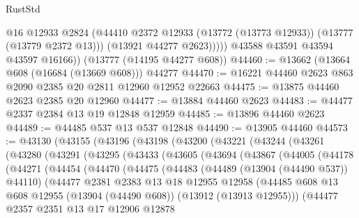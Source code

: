 \begin{lexlean}{RustStd}
\begin{coremodule}
                @16
                @12933
                @2824
                (@44410 @2372 @12933 (@13772 (@13773 @12933)) (@13777 (@13779 @2372 @13)))
                (@13921 @44277 @2623)))))
        @43588
        @43591
        @43594
        @43597
        @16166))
    (@13777 (@14195 @44277 @608))
@44460 := @13662 (@13664 @608 (@16684 (@13669 @608))) @44277
@44470 := @16221 @44460 @2623 @863 @2090 @2385 @20 @2811 @12960 @12952 @22663
@44475 := @13875 @44460 @2623 @2385 @20 @12960
@44477 := @13884 @44460 @2623
@44483 := @44477 @2337 @2384 @13 @19 @12848 @12959
@44485 := @13896 @44460 @2623
@44489 := @44485 @537 @13 @537 @12848
@44490 := @13905 @44460
@44573 := @43130
    (@43155
      (@43196
        (@43198
          (@43200
            (@43221
              (@43244
                (@43261
                  (@43280
                    (@43291
                      (@43295
                        (@43433
                          (@43605
                            (@43694
                              (@43867
                                (@44005
                                  (@44178
                                    (@44271
                                      (@44454
                                        (@44470
                                          (@44475
                                            (@44483
                                              (@44489 (@13904 (@44490 @537)) @44110)
                                              (@44477
                                                @2381
                                                @2383
                                                @13
                                                @18
                                                @12955
                                                @12958
                                                (@44485
                                                  @608
                                                  @13
                                                  @608
                                                  @12955
                                                  (@13904 (@44490 @608))
                                                  (@13912 (@13913 @12955)))
                                                (@44477
                                                  @2357
                                                  @2351
                                                  @13
                                                  @17
                                                  @12906
                                                  @12878

\end{coremodule}
\end{lexlean}

